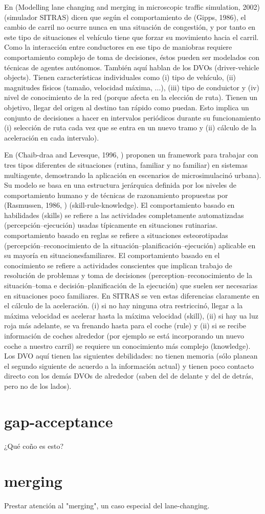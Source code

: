 En (Modelling lane changing and merging in microscopic traffic simulation, 2002) (simulador SITRAS) dicen que según el comportamiento de (Gipps, 1986), el cambio de carril no ocurre nunca en una situación de congestión, y por tanto en este tipo de situaciones el vehículo tiene que forzar su movimiento hacia el carril. Como la interacción entre conductores en ese tipo de maniobras requiere comportamiento complejo de toma de decisiones, éstos pueden ser modelados con técnicas de agentes autónomos. También aquí hablan de los DVOs (driver-vehicle objects). Tienen características individuales como (i) tipo de vehículo, (ii) magnitudes físicos (tamaño, velocidad máxima, ...), (iii) tipo de conduictor y (iv) nivel de conocimiento de la red (porque afecta en la elección de ruta). Tienen un objetivo, llegar del origen al destino tan rápido como puedan. Esto implica un conjunto de decisiones a hacer en intervalos periódicos durante su funcionamiento (i) selección de ruta cada vez que se entra en un nuevo tramo y (ii) cálculo de la aceleración en cada intervalo).

En (Chaib-draa and Levesque, 1996, ) proponen un framework para trabajar con tres tipos diferentes de situaciones (rutina, familiar y no familiar) en sistemas multiagente, demostrando la aplicación en escenarios de microsimulacinó urbana). Su modelo se basa en una estructura jerárquica definida por los niveles de comportamiento humano y de técnicas de razonamiento propuestas por (Rasmussen, 1986, ) (skill-rule-knowledge). El comportamiento basado en habilidades (skills) se refiere a las actividades completamente automatizadas (percepción--ejecución) usadas típicamente en situaciones rutinarias. comportamiento basado en reglas se refiere a situaciones esteorotipadas (percepción--reconocimiento de la situación--planificación--ejecución) aplicable en su mayoría en situacionesfamiliares. El comportamiento basado en el conocimiento se refiere a actividades conscientes que implican trabajo de resolución de problemas y toma de decisiones (perception--reconocimiento de la situación--toma e decisión--planificación de la ejecución) que suelen ser necesarias en situaciones poco familiares. En SITRAS se ven estas diferencias claramente en el cálculo de la aceleración. (i) si no hay ninguna otra restriccinó, llegar a la máxima velocidad es acelerar hasta la máxima velocidad (skill), (ii) si hay ua luz roja más adelante, se va frenando hasta para el coche (rule) y (ii) si se recibe información de coches alrededor (por ejemplo se está incorporando un nuevo coche a nuestro carril) se requiere un conocimiento más complejo (knowledge). Los DVO aquí tienen las siguientes debilidades: no tienen memoria (sólo planean el segundo siguiente de acuerdo a la información actual) y tienen poco contacto directo con los demás DVOs de alrededor (saben del de delante y del de detrás, pero no de los lados).

\section{gap-acceptance}

¿Qué coño es esto?

\section{merging}

Prestar atención al "merging", un caso especial del lane-changing.